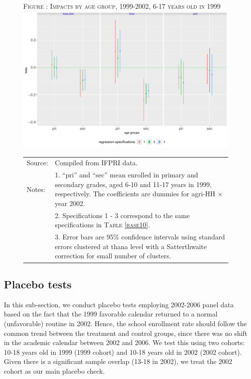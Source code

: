 \documentclass[12pt,letterpaper]{article}\usepackage[margin=1in]{geometry}
\newcommand{\0}{\ensuremath{\mbox{\boldmath $0$}}}
\begin{document}
\begin{figure}
\hfil\textsc{\footnotesize Figure \thefigure: Impacts by age group, 1999-2002, 6-17 years old in 1999\label{GenderAgeGroup2Impacts}}\\
\hfil \includegraphics[height=.23\paperheight]{Figures/GenderAgeGroup2Impacts.pdf}\\
\renewcommand{\arraystretch}{1}
\hfil\begin{tabular}{>{\hfill\scriptsize}p{1cm}<{}>{\scriptsize}p{11cm}<{\hfill}}
Source: & Compiled from IFPRI data. \\[-1ex]
Notes:& 1. ``pri'' and ``sec'' mean enrolled in primary and secondary grades, aged 6-10 and 11-17 years in 1999, respectively. The coefficients are dummies for agri-HH $\times$ year 2002.\\[-1ex]
& 2. Specifications 1 - 3 correspond to the same specifications in \textsc{Table \ref{base10}}. \\[-1ex]
& 3. Error bars are 95\% confidence intervals using standard errors clustered at thana level with a Satterthwaite correction for small number of clusters.
\end{tabular}
\end{figure}

\subsection{Placebo tests}

In this sub-section, we conduct placebo tests employing 2002-2006 panel data based on the fact that the 1999 favorable calendar returned to a normal (unfavorable) routine in 2002. Hence, the school enrollment rate should follow the common trend between the treatment and control groups, since there was no shift in the academic calendar between 2002 and 2006. We test this using two cohorts: 10-18 years old in 1999 (1999 cohort) and 10-18 years old in 2002 (2002 cohort). Given there is a significant sample overlap (13-18 in 2002), we treat the 2002 cohort as our main placebo check. 
\end{document}
